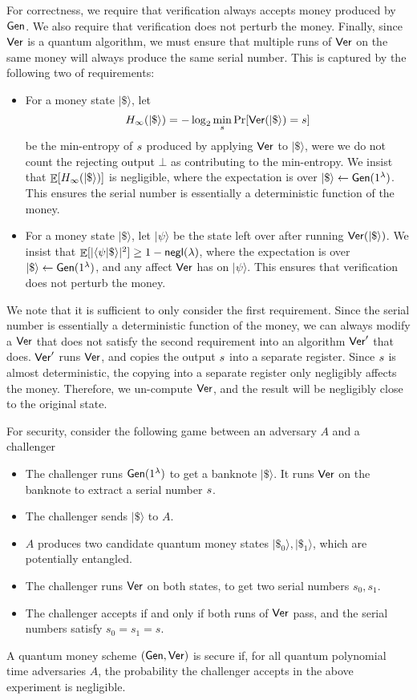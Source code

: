 \smallskip

For correctness, we require that verification always accepts money produced by ${\sf Gen}$.  We also require that verification does not perturb the money.  Finally, since ${\sf Ver}$ is a quantum algorithm, we must ensure that multiple runs of ${\sf Ver}$ on the same money will always produce the same serial number.  This is captured by the following two of requirements:
\begin{itemize}
	\item For a money state $|\$\rangle$, let \[H_\infty(|\$\rangle)=-\log_2 \min_s \Pr[{\sf Ver}(|\$\rangle)=s]\] be the min-entropy of ${s}$ produced by applying ${\sf Ver}$ to $|\$\rangle$, were we do not count the rejecting output $\bot$ as contributing to the min-entropy.  We insist that $\mathop{\mathbb E}[H_\infty(|\$\rangle)]$ is negligible, where the expectation is over $|\$\rangle\gets{\sf Gen}(1^\lambda)$.  This ensures the serial number is essentially a deterministic function of the money. 
	\item For a money state $|\$\rangle$, let $|\psi\rangle$ be the state left over after running ${\sf Ver}(|\$\rangle)$.  We insist that $\mathop{\mathbb E}[|\langle\psi|\$\rangle|^2]\geq 1-{\sf negl}(\lambda)$, where the expectation is over $|\$\rangle\gets{\sf Gen}(1^\lambda)$, and any affect ${\sf Ver}$ has on $|\psi\rangle$.  This ensures that verification does not perturb the money.
\end{itemize}

\begin{remark} We note that it is sufficient to only consider the first requirement.  Since the serial number is essentially a deterministic function of the money, we can always modify a ${\sf Ver}$ that does not satisfy the second requirement into an algorithm ${\sf Ver}'$ that does.  ${\sf Ver}'$ runs ${\sf Ver}$, and copies the output ${s}$ into a separate register.  Since ${s}$ is almost deterministic, the copying into a separate register only negligibly affects the money.  Therefore, we un-compute ${\sf Ver}$, and the result will be negligibly close to the original state.
\end{remark}

\noindent For security, consider the following game between an adversary $A$ and a challenger
\begin{itemize}
	\item The challenger runs ${\sf Gen}(1^\lambda)$ to get a banknote $|\$\rangle$.  It runs ${\sf Ver}$ on the banknote to extract a serial number ${s}$.
	\item The challenger sends $|\$\rangle$ to $A$.
	\item $A$ produces two candidate quantum money states $|\$_0\rangle,|\$_1\rangle$, which are potentially entangled. 
	\item The challenger runs ${\sf Ver}$ on both states, to get two serial numbers $s_0,s_1$.
	\item The challenger accepts if and only if both runs of ${\sf Ver}$ pass, and the serial numbers satisfy $s_0=s_1=s$.
\end{itemize}

\begin{definition} A quantum money scheme $({\sf Gen},{\sf Ver})$ is secure if, for all quantum polynomial time adversaries $A$, the probability the challenger accepts in the above experiment is negligible.
\end{definition}